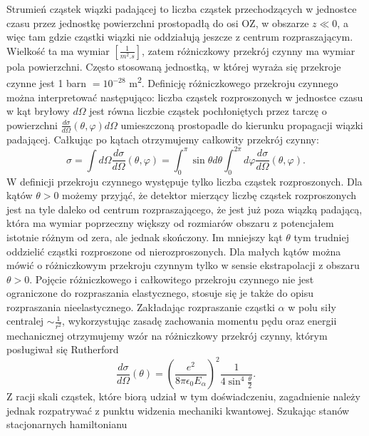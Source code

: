 \documentclass[11pt]{book}
\theoremstyle{definition}
\begin{document}
Strumień cząstek wiązki padającej to liczba cząstek przechodzących w jednostce czasu przez jednostkę powierzchni prostopadłą do osi OZ, w obszarze $z \ll 0$, a więc tam gdzie cząstki wiązki nie oddziałują jeszcze z centrum rozpraszającym. Wielkość ta ma wymiar $\left[\frac{1}{\si{m^2.s}}\right]$, zatem różniczkowy przekrój czynny ma wymiar pola powierzchni. Często stosowaną jednostką, w której wyraża się przekroje czynne jest 1 barn $= 10^{-28}$ \si{m^{2}}. Definicję różniczkowego przekroju czynnego można interpretować następująco: liczba cząstek rozproszonych w jednostce czasu w kąt bryłowy $d\Omega$ jest równa liczbie cząstek pochłoniętych przez tarczę o powierzchni $\frac{d\sigma}{d\Omega} \left( \theta, \varphi \right)d\Omega$ umieszczoną prostopadle do kierunku propagacji wiązki padającej. Całkując po kątach otrzymujemy całkowity przekrój czynny: 
\begin{equation}
\sigma = \int d\Omega \frac{d\sigma}{d\Omega} \left(\theta, \varphi\right) = \int_{0}^{\pi}\sin \theta d\theta \int_{0}^{2\pi} d\varphi \frac{d\sigma}{d\Omega}\left(\theta, \varphi\right).
\end{equation}
W definicji przekroju czynnego występuje tylko liczba cząstek rozproszonych. Dla kątów $\theta > 0$ możemy przyjąć, że detektor mierzący liczbę cząstek rozproszonych jest na tyle daleko od centrum rozpraszającego, że jest już poza wiązką padającą, która ma wymiar poprzeczny większy od rozmiarów obszaru z potencjałem istotnie różnym od zera, ale jednak skończony. Im mniejszy kąt $\theta$ tym trudniej oddzielić cząstki rozproszone od nierozproszonych. Dla małych kątów można mówić o różniczkowym przekroju czynnym tylko w sensie ekstrapolacji z obszaru $\theta > 0$. Pojęcie różniczkowego i całkowitego przekroju czynnego nie jest ograniczone do rozpraszania elastycznego, stosuje się je także do opisu rozpraszania nieelastycznego.
%
Zakładając rozpraszanie cząstki $\alpha$ w polu siły centralej $\sim \frac{1}{r^2}$, wykorzystując zasadę zachowania momentu pędu oraz energii mechanicznej otrzymujemy wzór na różniczkowy przekrój czynny, którym posługiwał się Rutherford \cite{10.1088/978-0-7503-1140-3}
%
\begin{equation}
\frac{d\sigma}{d\Omega}\left(\theta\right) = \left(\frac{e^2}{8 \pi \epsilon_0  E_{\alpha}} \right)^2 \frac{1}{4\sin^4 \frac{\theta}{2}}.
\end{equation}
%
Z racji skali cząstek, które biorą udział w tym doświadczeniu, zagadnienie należy jednak rozpatrywać z punktu widzenia mechaniki kwantowej. Szukając stanów stacjonarnych hamiltonianu
\end{document}
